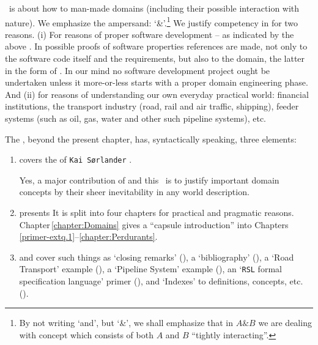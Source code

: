 \begynd
\pind  {} \primer\ is about how to  man-made
      domains (including their possible interaction with nature).
      \pind We emphasize the ampersand: `\&'.\footnote{By not writing `and', but `\&', we shall emphasize that in
      ${A\&B}$ we are dealing with  concept which consists of
      both $A$ and $B$ ``tightly interacting''.}
\pind We justify competency in 
      for two reasons.
\begynd
\pind (i) For reasons of proper  software
      development --  as indicated by the above . In 
      possible proofs of software properties references are made, not
      only to the software code itself and the requirements, but also
      to the domain, the latter in the form of . In our mind no software development project ought
      be undertaken unless it more-or-less starts with a proper domain
      engineering phase. And
\pind (ii) for reasons of  understanding our own
      everyday practical world: financial institutions, the transport
      industry (road, rail and air traffic, shipping), feeder systems
      (such as oil, gas, water and other such pipeline systems), etc. 
\afslut
\afslut

\label{sec:Structure}

\begynd
\pind The \primer, beyond the present chapter, has, syntactically
speaking, three elements:
\afslut

\begin{enumerate}
\item {} covers the  of
      \texttt{Kai S{\o}rlander}
      \cite{kaisorlander1994,kaisorlander1997,kaisorlander2002,kaisorlander2016,kaisorlander2022}.

      Yes, a major contribution of \cite{BjornerMonograph2020} and
      this \primer\ is to justify important domain concepts by
      their sheer inevitability in any world description.
      
\item {} presents  It is split into four chapters for practical
    and pragmatic
    reasons. Chapter\,\ref{chapter:Domains} gives a ``capsule
    introduction'' into Chapters\,\,\ref{primer-extq.1}--\ref{chapter:Perdurants}.
  
\item {}
  and  cover
  such things as `closing remarks' (\sort{\ref{chapter:Closing}}), a `bibliography' (\sort{\ref{primer.bib}}), a `Road
  Transport' example (\sort{\ref{Chapter:Road Transport}}), a `Pipeline System' example (\sort{\ref{appendix:Pipelines}}), an `\texttt{RSL}
  formal specification language' primer (\sort{\ref{RSL-intro}}), and `Indexes' to definitions, concepts, etc. (\sort{\ref{primer.indexes}}).
\end{enumerate}

